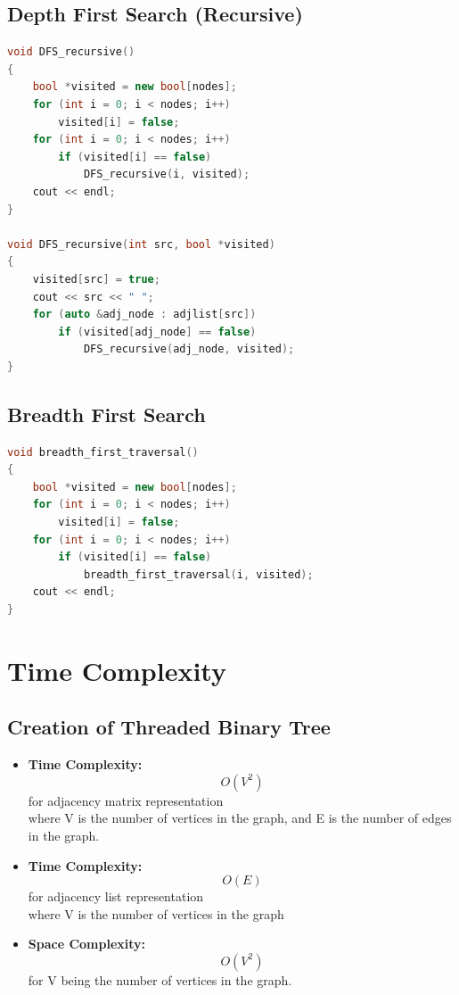 \documentclass[11pt]{article}
\begin{document}
\subsection{Depth First Search (Recursive)}
\begin{lstlisting}[language=C++]
void DFS_recursive()
{
    bool *visited = new bool[nodes];
    for (int i = 0; i < nodes; i++)
        visited[i] = false;
    for (int i = 0; i < nodes; i++)
        if (visited[i] == false)
            DFS_recursive(i, visited);
    cout << endl;
}

void DFS_recursive(int src, bool *visited)
{
    visited[src] = true;
    cout << src << " ";
    for (auto &adj_node : adjlist[src])
        if (visited[adj_node] == false)
            DFS_recursive(adj_node, visited);
}
\end{lstlisting}

\subsection{Breadth First Search}
\begin{lstlisting}[language=C++]
void breadth_first_traversal()
{
    bool *visited = new bool[nodes];
    for (int i = 0; i < nodes; i++)
        visited[i] = false;
    for (int i = 0; i < nodes; i++)
        if (visited[i] == false)
            breadth_first_traversal(i, visited);
    cout << endl;
}
\end{lstlisting}

\section{Time Complexity}

\subsection{Creation of Threaded Binary Tree}
\begin{itemize}
    \item \textbf{Time Complexity:} \[O(V^2)\] for adjacency matrix representation\\
    where V is the number of vertices in the graph, and E is the number of edges in the graph.
    \item \textbf{Time Complexity:} \[O(E)\] for adjacency list representation\\
    where V is the number of vertices in the graph
    \item \textbf{Space Complexity:} \[O(V^2)\] for V being the number of vertices in the graph.
\end{itemize}
\end{document}
